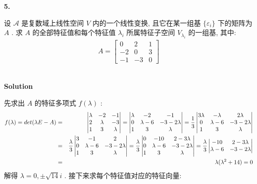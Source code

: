 \documentclass[11pt,a4paper,openany,oneside]{book}
\newcommand\Solution{\noindent\textbf{\textsf{Solution}}\par\medskip}
\begin{document}
\begin{myexample}
	\textbf{5.}

设 $ \mathcal{A} $ 是复数域上线性空间 $ V $ 内的一个线性变换, 且它在某一组基 $ \{\varepsilon_i \} $ 下的矩阵为 $ A $ . 求 $ A $ 的全部特征值和每个特征值 $ \lambda_i $ 所属特征子空间 $ V_{\lambda_i} $ 的一组基, 其中:
\begin{gather*}
A=
\begin{bmatrix}
0  &  2  &  1 \\
-2  &  0  &  3  \\
-1  &  -3  &  0
\end{bmatrix}
\end{gather*}  \\

\end{myexample}
\Solution

先求出 $ A $ 的特征多项式 $ f(\lambda) $ :
\begin{eqnarray}
f(\lambda)=det(\lambda E-A)&=&
\begin{vmatrix}
\lambda   &   -2  &  -1  \\
2         &  \lambda  &  -3  \\
1  &  3  &  \lambda
\end{vmatrix}=
\begin{vmatrix}
\lambda  &  -2           &  -1  \\
0        &  \lambda - 6  &  -3-2\lambda  \\
1        &  3            &  \lambda
\end{vmatrix}=\dfrac{1}{3}
\begin{vmatrix}
3\lambda  &  -\lambda   &  2\lambda  \\
0        &  \lambda - 6  &  -3-2\lambda  \\
1        &  3            &  \lambda
\end{vmatrix} \notag\\ 
&=& \dfrac{\lambda}{3}
\begin{vmatrix}
3  &  -1  &  2  \\
0  &  \lambda-6  &  -3-2\lambda  \\
1  &  3   &  \lambda
\end{vmatrix}=\dfrac{\lambda}{3}
\begin{vmatrix}
0  &  -10  &  2-3\lambda  \\
0  &  \lambda-6  &  -3-2\lambda  \\
1  &  3   &  \lambda
\end{vmatrix}
=\dfrac{\lambda}{3}
\begin{vmatrix}
-10  &  2-3\lambda  \\
\lambda-6  &  -3-2\lambda 
\end{vmatrix} \notag \\
&=&\lambda(\lambda^2 + 14)=0  \notag
\end{eqnarray}
解得 $ \lambda=0, \pm \sqrt{14}i $ . 接下来求每个特征值对应的特征向量:
\end{document}
